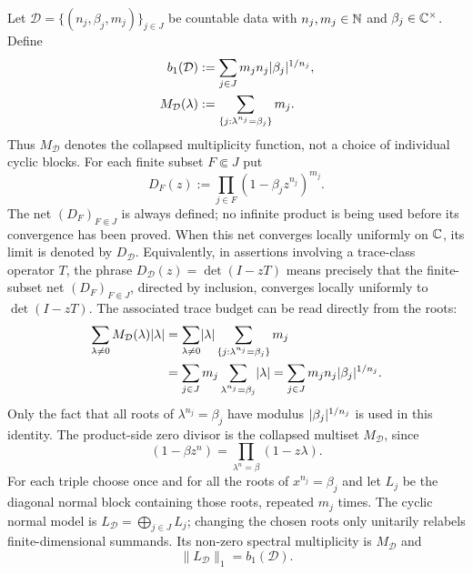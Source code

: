 Let \(\mathcal D=\{(n_j,\beta_j,m_j)\}_{j\in J}\) be countable data with
\(n_j,m_j\in\mathbb{N}\) and \(\beta_j\in\mathbb{C}^\times\).  Define
\[
\begin{aligned}
  b_1(\mathcal D)
  &:=\sum_{j\in J}m_j n_j\lvert \beta_j \rvert^{1/n_j},\\
  M_{\mathcal D}(\lambda)
  &:=\sum_{\{j:\lambda^{n_j}=\beta_j\}}m_j .
\end{aligned}
\]
Thus \(M_{\mathcal D}\) denotes the collapsed multiplicity function, not a
choice of individual cyclic blocks.
For each finite subset \(F\Subset J\) put
\[
  D_F(z):=\prod_{j\in F}(1-\beta_j z^{n_j})^{m_j}.
\]
The net \((D_F)_{F\Subset J}\) is always defined; no infinite product is being
used before its convergence has been proved.  When this net converges locally
uniformly on \(\mathbb{C}\), its limit is denoted by \(D_{\mathcal D}\).  Equivalently,
in assertions involving a trace-class operator \(T\), the phrase
\(D_{\mathcal D}(z)=\det(I-zT)\) means precisely that the finite-subset net
\((D_F)_{F\Subset J}\), directed by inclusion, converges locally uniformly to
\(\det(I-zT)\).
The associated trace budget can be read directly from the roots:
\[
\begin{aligned}
  \sum_{\lambda\ne0}M_{\mathcal D}(\lambda)\lvert \lambda \rvert
  &=
  \sum_{\lambda\ne0}\lvert \lambda \rvert
    \sum_{\{j:\lambda^{n_j}=\beta_j\}}m_j \\
  &=
  \sum_{j\in J}m_j
    \sum_{\lambda^{n_j}=\beta_j}\lvert \lambda \rvert
  =
  \sum_{j\in J}m_jn_j\lvert \beta_j \rvert^{1/n_j}.
\end{aligned}
\]
Only the fact that all roots of \(\lambda^{n_j}=\beta_j\) have modulus
\(\lvert \beta_j \rvert^{1/n_j}\) is used in this identity.
The product-side zero divisor is the collapsed multiset
\(M_{\mathcal D}\), since
\[
  (1-\beta z^n)=\prod_{\lambda^n=\beta}(1-z\lambda).
\]
For each triple choose once and for all the roots of \(x^{n_j}=\beta_j\) and
let \(L_{j}\) be the diagonal normal block containing those roots, repeated
\(m_j\) times.  The cyclic normal model is
\(L_{\mathcal D}=\bigoplus_{j\in J}L_j\); changing the chosen roots only
unitarily relabels finite-dimensional summands.  Its non-zero spectral
multiplicity is \(M_{\mathcal D}\) and
\[
  \|L_{\mathcal D}\|_1=b_1(\mathcal D).
\]

